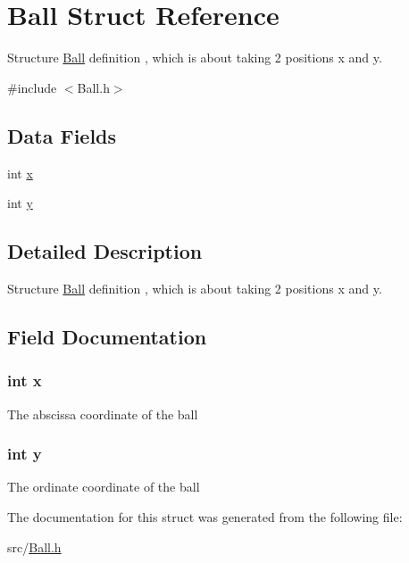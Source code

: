 \hypertarget{struct_ball}{\section{Ball Struct Reference}
\label{struct_ball}
}


Structure \hyperlink{struct_ball}{Ball} definition , which is about taking 2 positions x and y.  




{\ttfamily \#include $<$Ball.\-h$>$}

\subsection*{Data Fields}
\begin{DoxyCompactItemize}
\item 
int \hyperlink{struct_ball_a6150e0515f7202e2fb518f7206ed97dc}{x}
\item 
int \hyperlink{struct_ball_a0a2f84ed7838f07779ae24c5a9086d33}{y}
\end{DoxyCompactItemize}


\subsection{Detailed Description}
Structure \hyperlink{struct_ball}{Ball} definition , which is about taking 2 positions x and y. 

\subsection{Field Documentation}
\hypertarget{struct_ball_a6150e0515f7202e2fb518f7206ed97dc}{
\subsubsection[{x}]{\setlength{\rightskip}{0pt plus 5cm}int x}}\label{struct_ball_a6150e0515f7202e2fb518f7206ed97dc}
The abscissa coordinate of the ball \hypertarget{struct_ball_a0a2f84ed7838f07779ae24c5a9086d33}{
\subsubsection[{y}]{\setlength{\rightskip}{0pt plus 5cm}int y}}\label{struct_ball_a0a2f84ed7838f07779ae24c5a9086d33}
The ordinate coordinate of the ball 

The documentation for this struct was generated from the following file\-:\begin{DoxyCompactItemize}
\item 
src/\hyperlink{_ball_8h}{Ball.\-h}\end{DoxyCompactItemize}
